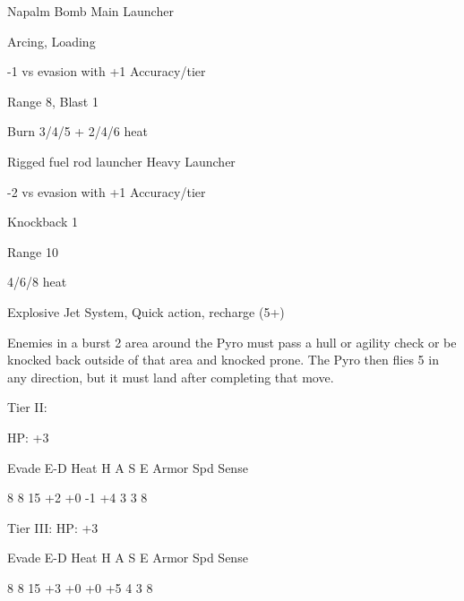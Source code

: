 Napalm Bomb  
Main Launcher
 
Arcing, Loading
 
-1 vs evasion with +1 Accuracy/tier
 
Range 8, Blast 1
 
Burn 3/4/5 + 2/4/6 heat
 

Rigged fuel rod launcher  
Heavy Launcher
 
-2 vs evasion with +1 Accuracy/tier
 
Knockback 1
 
Range 10
 
4/6/8 heat
 

Explosive Jet  
System, Quick action, recharge (5+)
 
Enemies in a burst 2 area around the Pyro must pass a hull or agility check or be knocked back  
outside of that area and knocked prone. The Pyro then flies 5 in any direction, but it must land  
after completing that move.
 

Tier II:
 
HP: +3
 

          Evade    E-D    Heat    H     A    S     E       Armor        Spd      Sense 

          8        8      15      +2    +0   -1    +4       3           3         8 

Tier III:  
HP: +3
 

          Evade    E-D    Heat    H     A    S     E       Armor        Spd      Sense 

          8        8      15      +3    +0   +0    +5       4           3         8 

                                                                                                               